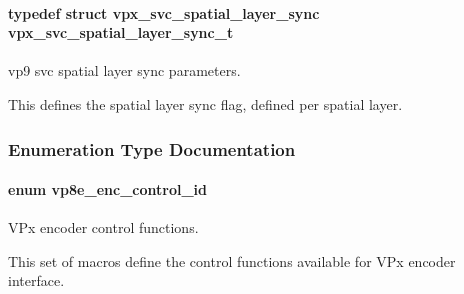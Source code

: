 \paragraph[{\texorpdfstring{vpx\+\_\+svc\+\_\+spatial\+\_\+layer\+\_\+sync\+\_\+t}{vpx_svc_spatial_layer_sync_t}}]{\setlength{\rightskip}{0pt plus 5cm}typedef struct {\bf vpx\+\_\+svc\+\_\+spatial\+\_\+layer\+\_\+sync}  {\bf vpx\+\_\+svc\+\_\+spatial\+\_\+layer\+\_\+sync\+\_\+t}}\hypertarget{group__vp8__encoder_ga7b4f4746d01150d9e73a03bdd8eee296}{}\label{group__vp8__encoder_ga7b4f4746d01150d9e73a03bdd8eee296}


vp9 svc spatial layer sync parameters. 

This defines the spatial layer sync flag, defined per spatial layer. 

\subsubsection{Enumeration Type Documentation}
\paragraph[{\texorpdfstring{vp8e\+\_\+enc\+\_\+control\+\_\+id}{vp8e_enc_control_id}}]{\setlength{\rightskip}{0pt plus 5cm}enum {\bf vp8e\+\_\+enc\+\_\+control\+\_\+id}}\hypertarget{group__vp8__encoder_ga6deae3d561c838952552c3d3756322ec}{}\label{group__vp8__encoder_ga6deae3d561c838952552c3d3756322ec}


V\+Px encoder control functions. 

This set of macros define the control functions available for V\+Px encoder interface.

